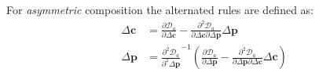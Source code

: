 For \emph{asymmetric} composition the alternated rules are defined as:
\begin{equation}
    \begin{aligned}
        \Delta \mathbf{c} & = \frac{\partial \mathcal{D}_a}{\partial \Delta \mathbf{c}} - \frac{\partial^2 \mathcal{D}_a}{\partial \Delta \mathbf{c} \partial \Delta \mathbf{p}} \Delta \mathbf{p} 
        \\
        \Delta \mathbf{p} & = \frac{\partial^2 \mathcal{D}_a}{\partial^2 \Delta \mathbf{p}}^{-1} \left( \frac{\partial \mathcal{D}_a}{\partial \Delta \mathbf{p}} - \frac{\partial^2 \mathcal{D}_a}{\partial \Delta \mathbf{p} \partial \Delta \mathbf{c}} \Delta \mathbf{c} \right)
        \label{eq:asymmetric_newton_alternated_solution}
    \end{aligned}
\end{equation}

